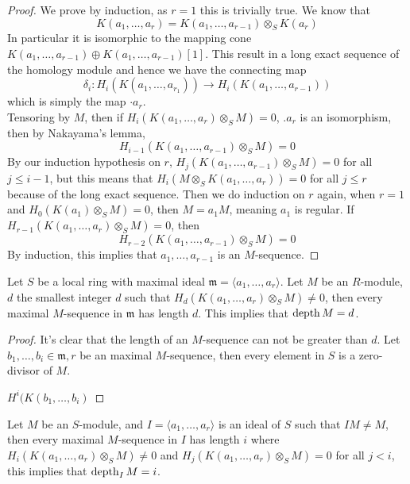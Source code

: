 \begin{proof}
	We prove by induction, as $r = 1$ this is trivially true.
	We know that 
	$$K(a_1, \dots, a_r) = K(a_1, \dots, a_{r-1}) \otimes_S K(a_r)$$
	In particular it is isomorphic to the mapping cone $K(a_1, \dots, a_{r-1}) \oplus K(a_1, \dots, a_{r-1})[1]$.
	This result in a long exact sequence of the homology module and hence we have the connecting map 
	$$\delta_i: H_i(K(a_1, \dots, a_{r_1})) \to H_i(K(a_1, \dots, a_{r-1}))$$
	which is simply the map $\cdot a_r$.\\
	Tensoring by $M$, then if $H_i(K(a_1, \dots, a_r) \otimes_S M) = 0$, $.a_r$ is an isomorphism, then by Nakayama's lemma, 
	$$H_{i-1}(K(a_1, \dots, a_{r-1}) \otimes_S M) = 0$$
	By our induction hypothesis on $r$, $H_{j}(K(a_1, \dots, a_{r-1}) \otimes_S M) = 0$ for all $j \leq i-1$, but this means that $H_i(M \otimes_S K(a_1, \dots, a_r)) = 0$ for all $j \leq r$ because of the long exact sequence.
	Then we do induction on $r$ again, when $r=1$ and $H_0(K(a_1)\otimes_S M) = 0$, then $M = a_1 M$, meaning $a_1$ is regular.
	If $H_{r-1}(K(a_1, \dots, a_r) \otimes_S M) = 0$, then 
	$$H_{r-2}(K(a_1, \dots, a_{r-1}) \otimes_S M) = 0$$
	By induction, this implies that $a_1, \dots, a_{r-1}$ is an $M$-sequence.
\end{proof}

\begin{theorem}
	Let $S$ be a local ring with maximal ideal $\mathfrak{m} = \langle a_1, \dots, a_r\rangle$. Let $M$ be an $R$-module, $d$ the smallest integer $d$ such that $H_d(K(a_1, \dots, a_r) \otimes_S M) \neq 0$, then every maximal $M$-sequence in $\mathfrak{m}$ has length $d$.
	This implies that $\operatorname{depth} M = d$.
\end{theorem}
\begin{proof}
	It's clear that the length of an $M$-sequence can not be greater than $d$.
	Let $b_1, \dots, b_i \in \mathfrak{m}, r$ be an maximal $M$-sequence, then every element in $S$ is a zero-divisor of $M$.

	$H^i(K(b_1, \dots, b_i) $
\end{proof}
\begin{lemma}

\end{lemma}
\begin{theorem}
	Let $M$ be an $S$-module, and $I = \langle a_1, \dots, a_r\rangle$ is an ideal of $S$ such that $IM \neq M$, then every maximal $M$-sequence in $I$ has length $i$  where $H_i(K(a_1, \dots, a_r) \otimes_S M) \neq 0$ and $H_j(K(a_1, \dots, a_r) \otimes_S M) = 0$ for all $j < i$, this implies that $\operatorname{depth}_I M = i$.
\end{theorem}


